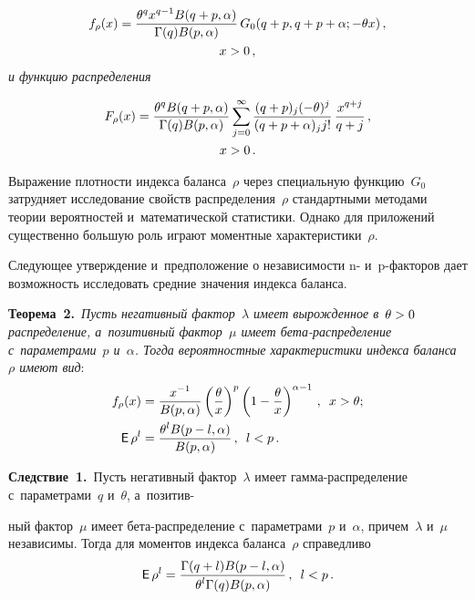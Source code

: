 \begin{multicols}{2}
\noindent
\begin{multline}
\label{Density_rho_gamma_beta}
f_\rho(x)=\displaystyle\frac{\displaystyle \theta^q x^{q-1} B(q+p,\alpha)\mathstrut}{\displaystyle \Gamma(q)B(p,\alpha)\mathstrut}\,
 G_0(q+p,q+p+\alpha;-\theta x)\,,\\
   x>0\,,
\end{multline}
\textit{и функцию распределения}

\noindent
\begin{multline*}
F_\rho(x)=\displaystyle\frac{\displaystyle \theta^q B(q+p,\alpha)\mathstrut}{\displaystyle \Gamma(q)B(p,\alpha)\mathstrut}
\sum\limits_{j=0}^{\infty}\displaystyle\frac{\displaystyle (q+p)_j(-\theta)^j\mathstrut}{\displaystyle (q+p+\alpha)_jj!\mathstrut}\,
\displaystyle\frac{\displaystyle x^{q+j}\mathstrut}{\displaystyle q+j\mathstrut}\,,\\ x>0\,.
\end{multline*}

\smallskip

Выражение плотности индекса баланса~$\rho$ через специальную функцию~$G_0$ 
затрудняет исследование свойств распределения~$\rho$ стандартными методами 
тео\-рии вероятностей и~математической статистики. Однако для приложений 
существенно большую роль играют моментные характеристики~$\rho$.

Следующее утверждение и~предположение о независимости n- 
и~p-фак\-то\-ров дает возможность исследовать средние значения индекса баланса.

\smallskip

\noindent
\textbf{Теорема~2.}\ 
\textit{Пусть негативный фактор~$\lambda$ имеет вырожденное в~$\theta\hm>0$ 
распределение, а~позитивный фактор~$\mu$ имеет бе\-та-рас\-пре\-де\-ле\-ние 
с~па\-ра\-мет\-ра\-ми~$p$ и~$\alpha$. 
Тогда вероятностные характеристики индекса баланса~$\rho$ имеют вид}:
\begin{align*}
f_\rho(x)&=\displaystyle\frac{\displaystyle x^{-1}\mathstrut}{\displaystyle B(p,\alpha)\mathstrut}
\left(\displaystyle\frac{\displaystyle \theta\mathstrut}{\displaystyle x\mathstrut}\right)^p\left(1-\displaystyle\frac{\displaystyle \theta\mathstrut}{\displaystyle x\mathstrut}\right)^{\alpha-1}\,,\enskip
x>\theta;\\
{\sf E}\,\rho^l&=\displaystyle\frac{\displaystyle \theta^{l}B(p-l,\alpha)\mathstrut}{\displaystyle B(p,\alpha)\mathstrut}\,,\enskip l<p\,.
\end{align*}


\noindent
\textbf{Следствие~1.}\
Пусть негативный фактор~$\lambda$ имеет гам\-ма-рас\-пре\-де\-ле\-ние 
с~параметрами~$q$ и~$\theta$, а~позитив-\linebreak\vspace*{-12pt}

\pagebreak

\noindent
ный фактор~$\mu$ 
имеет бе\-та-рас\-пре\-де\-ле\-ние с~па\-ра\-мет\-ра\-ми~$p$ и~$\alpha$, 
причем~$\lambda$ и~$\mu$ независимы. Тогда для моментов индекса баланса~$\rho$ 
справедливо
$$
{\sf E}\,\rho^l=\displaystyle\frac{\displaystyle \Gamma(q+l)B(p-l,\alpha)\mathstrut}{\displaystyle \theta^l\Gamma(q)B(p,\alpha)\mathstrut}\,,\enskip
l<p\,.
$$



\end{multicols}
